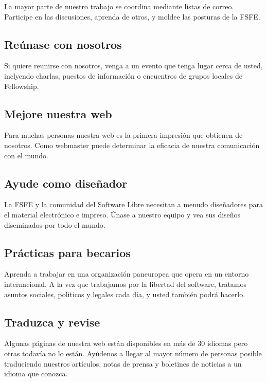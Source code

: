 \documentclass[10pt,foldmark,tumble]{leaflet}
\begin{document}
    La mayor parte de nuestro trabajo se coordina mediante listas de correo. Participe en las discusiones, aprenda de otros, y moldee las posturas de la FSFE.

\subsection{Reúnase con nosotros}

    Si quiere reunirse con nosotros, venga a un evento que tenga lugar cerca de usted, inclyendo charlas, puestos de información o encuentros de grupos locales de Fellowship.
    
\subsection{Mejore nuestra web}

    Para muchas personas nuestra web es la primera impresión que obtienen de nosotros. Como webmaster puede determinar la eficacia de nuestra comunicación con el mundo.
    
\subsection{Ayude como diseñador}

    La FSFE y la comunidad del Software Libre necesitan a menudo diseñadores para el material electrónico e impreso. Únase a nuestro equipo y vea sus diseños diseminados por todo el mundo.
    
\subsection{Prácticas para becarios}

    Aprenda a trabajar en una organización paneuropea que opera en un entorno internacional. A la vez que trabajamos por la libertad del software, tratamos asuntos sociales, politicos y legales cada día, y usted también podrá hacerlo.

\subsection{Traduzca y revise}

    Algunas páginas de nuestra web están disponibles en más de 30 idiomas pero otras todavía no lo están. Ayúdenos a llegar al mayor número de personas posible traduciendo nuestros artículos, notas de prensa y boletines de noticias a un idioma que conozca.
    
\end{document}
